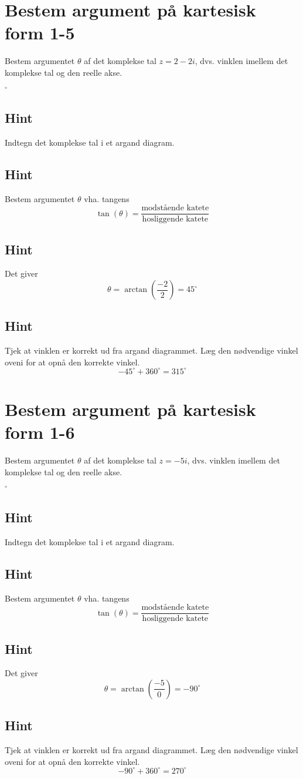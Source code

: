 \documentclass{article}
\newenvironment{exercise}[1]{\newpage\section{#1}}{}
\newcommand{\answerbox}[1]{\fbox{$#1$}}
\newcommand{\hint}{\subsection*{Hint}}
\begin{document}
\begin{exercise}{Bestem argument på kartesisk form 1-5}
	
	Bestem argumentet $\theta$ af det komplekse tal $z=2-2i$, dvs. vinklen imellem det komplekse tal og den reelle akse.
	
	\answerbox{315^\circ}$^\circ$
	
	
	\hint 
	
	Indtegn det komplekse tal i et argand diagram.
	
	
	\hint
	
	Bestem argumentet $\theta$ vha. tangens
	\[
	\tan(\theta)=\frac{\textrm{modstående katete}}{\textrm{hosliggende katete}}
	\]
	
	\hint 
	
	Det giver
	\[
	\theta = \arctan \left(\frac{-2}{2}\right) =45^\circ
	\]
	
	\hint
	
	Tjek at vinklen er korrekt ud fra argand diagrammet. Læg den nødvendige vinkel oveni for at opnå den korrekte vinkel. 
	\[
	-45^\circ + 360^\circ = 315^\circ
	\]
	
\end{exercise}

\newpage

\begin{exercise}{Bestem argument på kartesisk form 1-6}
	
	Bestem argumentet $\theta$ af det komplekse tal $z=-5i$, dvs. vinklen imellem det komplekse tal og den reelle akse.
	
	\answerbox{270}$^\circ$
	
	
	\hint 
	
	Indtegn det komplekse tal i et argand diagram.
	
	
	\hint
	
	Bestem argumentet $\theta$ vha. tangens
	\[
	\tan(\theta)=\frac{\textrm{modstående katete}}{\textrm{hosliggende katete}}
	\]
	
	\hint 
	
	Det giver
	\[
	\theta = \arctan \left(\frac{-5}{0}\right) = -90^\circ
	\]
	
	\hint
	
	Tjek at vinklen er korrekt ud fra argand diagrammet. Læg den nødvendige vinkel oveni for at opnå den korrekte vinkel. 
	\[
	-90^\circ + 360^\circ  = 270^\circ 
	\]
	
	
\end{exercise}

\newpage
\end{document}
